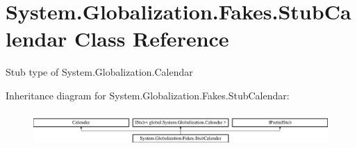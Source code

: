 \hypertarget{class_system_1_1_globalization_1_1_fakes_1_1_stub_calendar}{\section{System.\-Globalization.\-Fakes.\-Stub\-Calendar Class Reference}
\label{class_system_1_1_globalization_1_1_fakes_1_1_stub_calendar}
}


Stub type of System.\-Globalization.\-Calendar 


Inheritance diagram for System.\-Globalization.\-Fakes.\-Stub\-Calendar\-:\begin{figure}[H]
\begin{center}
\leavevmode
\includegraphics[height=1.323877cm]{class_system_1_1_globalization_1_1_fakes_1_1_stub_calendar}
\end{center}
\end{figure}
